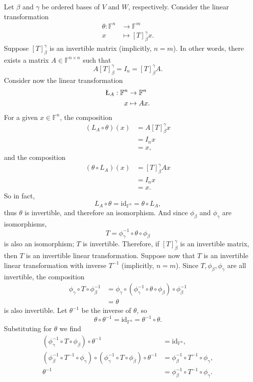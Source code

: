 \documentclass[12pt]{article}
\newcommand{\F}{\mathbb{F}}
\newcommand{\id}[1]{\text{id}_{#1}}
\begin{document}
Let $\beta$ and $\gamma$ be ordered bases of $V$ and $W$, respectively. Consider the linear transformation
\begin{align*}
    \theta: \F^n &\rightarrow \F^m \\
            x &\mapsto [T]_\beta^\gamma x.
\end{align*}
Suppose $[T]_\beta^\gamma$ is an invertible matrix (implicitly, $n=m$). In other words, there exists a matrix $A\in\F^{n\times n}$ such that 
\[A[T]_\beta^\gamma = I_n = [T]_\beta^\gamma A.\]
Consider now the linear transformation
\begin{align*}
    \L_A: \F^n &\rightarrow \F^n \\
            x &\mapsto A x.
\end{align*}
For a given $x\in\F^n$, the composition
\begin{align*}
    (L_A \circ \theta)(x)
        &= A[T]_\beta^\gamma x \\
        &= I_n x \\
        &= x,
\end{align*}
and the composition
\begin{align*}
    (\theta \circ L_A)(x)
        &= [T]_\beta^\gamma A x \\
        &= I_n x \\
        &= x.
\end{align*}
So in fact,
\[L_A\circ\theta = \id{\F^n} = \theta\circ L_A,\]
thus $\theta$ is invertible, and therefore an isomorphism. And since $\phi_\beta$ and $\phi_\gamma$ are isomorphisms,
\[T = \phi_\gamma^{-1}\circ\theta\circ\phi_\beta\]
is also an isomorphism; $T$ is invertible. Therefore, if $[T]_\beta^\gamma$ is an invertible matrix, then $T$ is an invertible linear transformation. Suppose now that $T$ is an invertible linear transformation with inverse $T^{-1}$ (implicitly, $n=m$). Since $T,\phi_\beta,\phi_\gamma$ are all invertible, the composition
\begin{align*}
    \phi_\gamma \circ T \circ \phi_\beta^{-1}
        &= \phi_\gamma \circ (\phi_\gamma^{-1}\circ \theta \circ \phi_\beta) \circ \phi_\beta^{-1} \\
        &= \theta
\end{align*} 
is also invertible. Let $\theta^{-1}$ be the inverse of $\theta$, so 
\[\theta\circ\theta^{-1}=\id{\F^n}=\theta^{-1}\circ\theta.\]
Substituting for $\theta$ we find
\begin{align*}
    (\phi_\gamma^{-1}\circ T\circ \phi_\beta)\circ\theta^{-1} & =\id{\F^n}, \\
    (\phi_\beta^{-1}\circ T^{-1} \circ \phi_\gamma)\circ(\phi_\gamma^{-1}\circ T\circ \phi_\beta)\circ\theta^{-1} &= \phi_\beta^{-1}\circ T^{-1} \circ \phi_\gamma, \\
    \theta^{-1} &= \phi_\beta^{-1}\circ T^{-1} \circ \phi_\gamma.
\end{align*}
\end{document}
